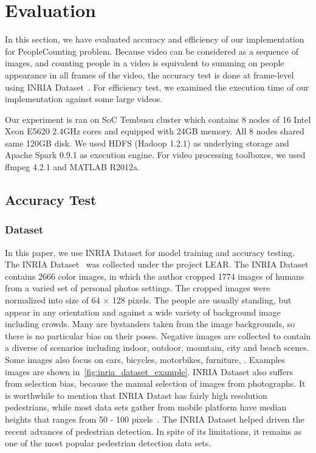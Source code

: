\section{Evaluation}
\label{sec:sec_experiment}
In this section, we have evaluated accuracy and efficiency of our implementation
for PeopleCounting problem. Because video can be considered as a sequence of
images, and counting people in a video is equivalent to summing on people
appearance in all frames of the video, the accuracy test is done at frame-level
using INRIA Dataset~\cite{2005_CVPR_Dalal}. For efficiency test, we examined the
execution time of our implementation against some large videos.

Our experiment is ran on SoC Tembusu cluster which contains 8 nodes of 16
Intel Xeon E5620 2.4GHz cores and equipped with 24GB memory. All 8 nodes shared
same 120GB disk. We used HDFS (Hadoop 1.2.1) as underlying storage and Apache
Spark 0.9.1 as execution engine. For video processing toolboxes, we used ffmpeg
4.2.1 and MATLAB R2012a.

\subsection{Accuracy Test}
\subsubsection{Dataset}
In this paper, we use INRIA Dataset for model training and accuracy testing. 
The INRIA Dataset~\cite{2005_CVPR_Dalal} was collected under the project LEAR.
The INRIA Dataset contains 2666 color images, in which the author cropped 1774
images of humans from a varied set of personal photos settings. The cropped
images were normalized into size of 64 $\times$ 128 pixels. The people are
usually standing, but appear in any orientation and against a wide variety of 
background image including crowds. Many are bystanders taken from the image
backgrounds, so there is no particular bias on their poses. Negative images are
collected to contain a diverse of scenarios including indoor, outdoor, mountain,
city and beach scenes. Some images also focus on cars, bicycles, motorbikes,
furniture, \etc.
Examples images are shown in~\fig\ref{fig:inria_dataset_example}.
INRIA Dataset also suffers from selection bias, because the manual selection of
images from photographs. It is worthwhile to mention that INRIA Datast has
fairly high resolution pedestrians, while most data sets gather from mobile
platform have median heights that ranges from 50 - 100
pixels~\cite{2012_PAMI_Dollar}. The INRIA Dataset helped driven the recent
advances of pedestrian detection. In spite of its limitations, it remains as one
of the most popular pedestrian detection data sets. 


